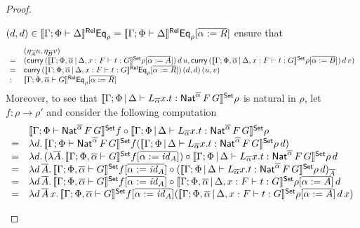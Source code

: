 \documentclass[acmsmall,review,anonymous]{acmart}
\theoremstyle{definition}
\renewcommand{\id}{\mathit{id}}
\begin{document}
\begin{proof}
\begin{itemize}
$(d,d) \in \llbracket{\Gamma;\Phi \vdash \Delta}\rrbracket^{\mathsf{Rel}} \mathsf{Eq}_\rho =
\llbracket{\Gamma;\Phi \vdash \Delta}\rrbracket^{\mathsf{Rel}} \mathsf{Eq}_\rho[\overline{\alpha := R}]$
ensure that
\[\begin{array}{ll}
& (\eta_{\overline{A}}u,\eta_{\overline{B}}v)\\
= & (\mathsf{curry}\, (\llbracket{\Gamma;\Phi,\overline{\alpha} \,|\, \Delta, x : F
  \vdash t: G}\rrbracket^{\mathsf{Set}}\rho[\overline{\alpha := A}])\,d\,u, \mathsf{curry}\,
(\llbracket{\Gamma;\Phi,\overline{\alpha} \,|\, \Delta, x : F \vdash t:
  G}\rrbracket^{\mathsf{Set}}\rho[\overline{\alpha := B}])\,d\,v)\\
= & \mathsf{curry}\, (\llbracket{\Gamma;\Phi,\overline{\alpha} \,|\, \Delta, x : F
  \vdash t: G}\rrbracket^{\mathsf{Rel}}\mathsf{Eq}_\rho[\overline{\alpha := R}])\,(d,d)\,(u,v)\\
: & \llbracket{\Gamma;\Phi,\overline{\alpha} \vdash G}\rrbracket^{\mathsf{Rel}}
\mathsf{Eq}_{\rho}[\overline{\alpha := R}]  
\end{array}\]
Moreover, to see that
$\llbracket{\Gamma;\Phi \,|\, \Delta \vdash L_{\overline{\alpha}} x.t
: \mathsf{Nat}^{\overline{\alpha}} \,F \,G}\rrbracket^{\mathsf{Set}} \rho$
is natural in $\rho$,
let $f : \rho \to \rho'$ and consider the following computation
  \[\begin{array}{ll}
  &\setsem{\Gamma;\Phi \vdash \Nat^{\overline{\alpha}} \,F \,G}f
  \circ
  \setsem{\Gamma;\Phi \,|\, \Delta \vdash L_{\overline{\alpha}}
    x.t : \Nat^{\overline{\alpha}} \,F \,G}\rho \\
  = & \lambda d.\,
  \setsem{\Gamma;\Phi \vdash \Nat^{\overline{\alpha}} \,F \,G}f
  (\setsem{\Gamma;\Phi \,|\, \Delta \vdash L_{\overline{\alpha}}
    x.t : \Nat^{\overline{\alpha}} \,F \,G}\rho\, d) \\
  = & \lambda d.\,
  (\lambda \ol{A}.\, \setsem{\Gamma;\Phi,\ol{\alpha} \vdash G}f[\ol{\alpha := \id_A}])
  \circ
  \setsem{\Gamma;\Phi \,|\, \Delta \vdash L_{\overline{\alpha}}
    x.t : \Nat^{\overline{\alpha}} \,F \,G}\rho\, d \\
  = & \lambda d\, \ol{A}.\,
  \setsem{\Gamma;\Phi,\ol{\alpha} \vdash G}f[\ol{\alpha := \id_A}]
  \circ
  (\setsem{\Gamma;\Phi \,|\, \Delta \vdash L_{\overline{\alpha}}
    x.t : \Nat^{\overline{\alpha}} \,F \,G}\rho\, d)_{\ol{A}} \\
  = & \lambda d\, \ol{A}.\,
  \setsem{\Gamma;\Phi,\ol{\alpha} \vdash G}f[\ol{\alpha := \id_A}]
  \circ
  \setsem{\Gamma;\Phi, \ol{\alpha} \,|\, \Delta, x : F \vdash t : G}\rho[\ol{\alpha := A}]\, d \\
  = & \lambda d\, \ol{A}\, x.\,
  \setsem{\Gamma;\Phi,\ol{\alpha} \vdash G}f[\ol{\alpha := \id_A}]
  (\setsem{\Gamma;\Phi, \ol{\alpha} \,|\, \Delta, x : F \vdash t : G}\rho[\ol{\alpha := A}]\, d\, x) \\

\end{array}\]
\end{itemize}
\end{proof}
\end{document}
